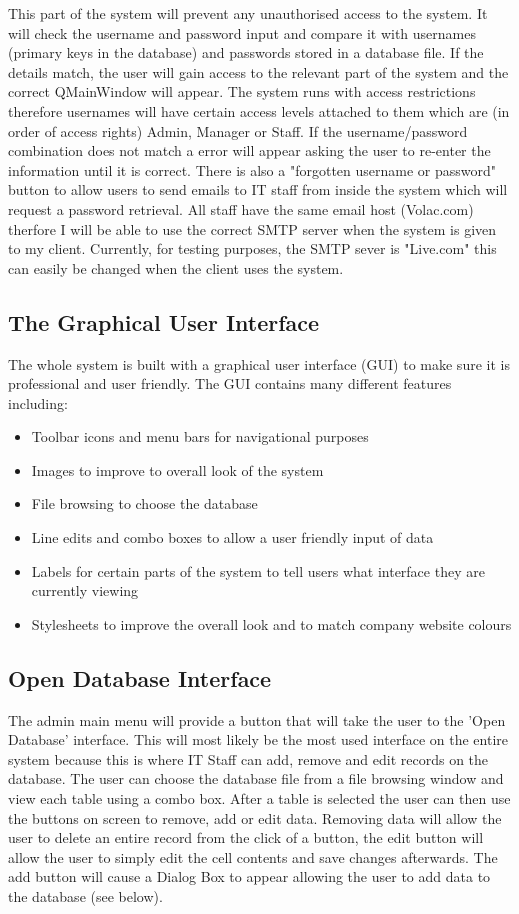 This part of the system will prevent any unauthorised access to the system. It will check the username and password input and compare it with usernames (primary keys in the database) and passwords stored in a database file. If the details match, the user will gain access to the relevant part of the system and the correct QMainWindow will appear. The system runs with access restrictions therefore usernames will have certain access levels attached to them which are (in order of access rights) Admin, Manager or Staff. If the username/password combination does not match a error will appear asking the user to re-enter the information until it is correct. There is also a "forgotten username or password" button to allow users to send emails to IT staff from inside the system which will request a password retrieval. All staff have the same email host (Volac.com) therfore I will be able to use the correct SMTP server when the system is given to my client. Currently, for testing purposes, the SMTP sever is "Live.com" this can easily be changed when the client uses the system.

\subsection{The Graphical User Interface}

The whole system is built with a graphical user interface (GUI) to make sure it is professional and user friendly. The GUI contains many different features including:
\begin{itemize}
\item Toolbar icons and menu bars for navigational purposes
\item Images to improve to overall look of the system
\item File browsing to choose the database
\item Line edits and combo boxes to allow a user friendly input of data
\item Labels for certain parts of the system to tell users what interface they are currently viewing
\item Stylesheets to improve the overall look and to match company website colours
\end{itemize}

\subsection{Open Database Interface}

The admin main menu will provide a button that will take the user to the 'Open Database' interface. This will most likely be the most used interface on the entire system because this is where IT Staff can add, remove and edit records on the database. The user can choose the database file from a file browsing window and view each table using a combo box. After a table is selected the user can then use the buttons on screen to remove, add or edit data. Removing data will allow the user to delete an entire record from the click of a button, the edit button will allow the user to simply edit the cell contents and save changes afterwards. The add button will cause a Dialog Box to appear allowing the user to add data to the database (see below).


